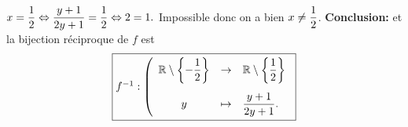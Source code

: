 \documentclass[a4paper, 11pt,reqno]{article}
\begin{document}
\begin{correction}
\begin{itemize}
\begin{itemize}
					$x=\displaystyle\frac{1}{2}\Leftrightarrow \displaystyle\frac{y+1}{2y+1}=\displaystyle\frac{1}{2}\Leftrightarrow 2=1.$
					Impossible donc on a bien $x\not= \displaystyle\frac{1}{2}$.
					\textbf{Conclusion:}  et la bijection r\'eciproque de $f$ est
					$$\fbox{$f^{-1}:\left( \begin{array}{cll}
									\R\setminus\left\lbrace -\ddp\demi\right\rbrace & \rightarrow & \R\setminus\left\lbrace \ddp\demi\right\rbrace\vsec \\
									y                                               & \mapsto     & \ddp\frac{y+1}{2y+1}.
								\end{array}\right.$}$$
			\end{itemize}
	\end{itemize}
\end{correction}
\end{document}
